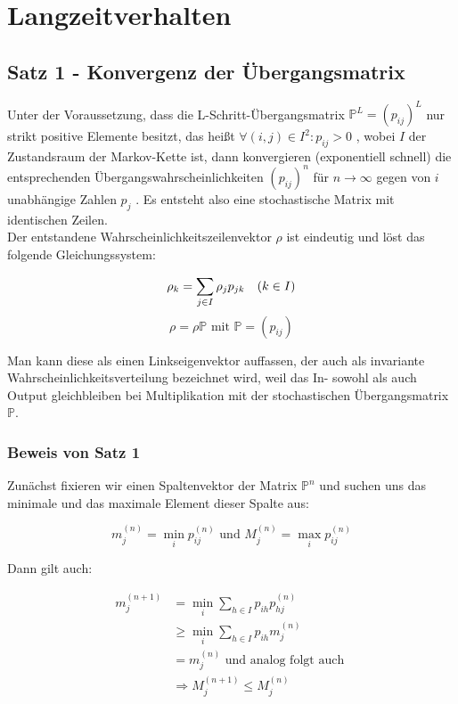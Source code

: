 \documentclass[a4paper]{article}
\begin{document}
\section{Langzeitverhalten}

\subsection{Satz 1 - Konvergenz der Übergangsmatrix}

Unter der Voraussetzung, dass die L-Schritt-Übergangsmatrix 
$\mathbb{P} ^{L} = \left(
	p_{ij}
\right) ^{L}$
nur strikt positive
Elemente besitzt, das heißt 
$\forall (i, j) \in I^2 : p_{ij} > 0$
, wobei $I$ der Zustandsraum der
Markov-Kette ist, dann konvergieren (exponentiell schnell) die entsprechenden
Übergangswahrscheinlichkeiten 
$\left(
	p_{ij}
\right) ^{n}$
für $n \rightarrow \infty$ gegen von $i$ unabhängige Zahlen $p_{j}$ . Es
entsteht also eine stochastische Matrix mit identischen Zeilen. 
\\

Der entstandene
Wahrscheinlichkeitszeilenvektor $\rho$ ist eindeutig und löst das folgende Gleichungssystem:

\[
	\rho_k = \sum_{j \in I} \rho_j p_{jk} \quad (k \in I) \\
\] 
\[
	\rho = \rho \mathbb{P} \text{ mit } \mathbb{P} = (p_{ij})
\]

Man kann diese als einen Linkseigenvektor auffassen, der auch als invariante
Wahrscheinlichkeitsverteilung bezeichnet wird, weil das In- sowohl als auch Output gleichbleiben
bei Multiplikation mit der stochastischen Übergangsmatrix $\mathbb{P}$.

\subsubsection{Beweis von Satz 1}
Zunächst fixieren wir einen Spaltenvektor der Matrix $\mathbb{P}^{n}$ und suchen uns das minimale und das
maximale Element dieser Spalte aus:

\[
m_j ^{(n)} = \min_i p_{ij}^{(n)} \text{ und }
M_j^{(n)} = \max_i p_{ij}^{(n)}
\]

Dann gilt auch:

\begin{align*}
	m_j^{(n+1)} &= \min_i \sum_{h\in I} p_{ih} p_{hj} ^{(n)} \\
				&\geq \min_i \sum_{h\in I} p_{ih} m_{j} ^{(n)} \\
				&= m_j ^{(n)} \text{ und analog folgt auch } \\
				&\Rightarrow M_j ^{(n+1)} \leq M_j ^{(n)}
\end{align*}
\end{document}
